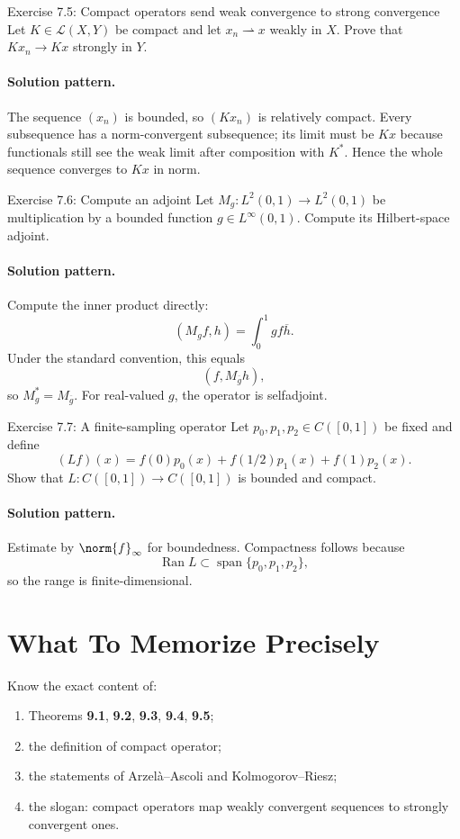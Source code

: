 \documentclass[header={Lecture 7 Exam Study Notes}]{study-note}
\begin{document}
\begin{exbox}{Exercise 7.5: Compact operators send weak convergence to strong convergence}
Let $K\in\mathcal L(X,Y)$ be compact and let $x_n\rightharpoonup x$ weakly in $X$. Prove that $Kx_n\to Kx$ strongly in $Y$.

\paragraph{Solution pattern.}
The sequence $(x_n)$ is bounded, so $(Kx_n)$ is relatively compact. Every subsequence has a norm-convergent subsequence; its limit must be $Kx$ because functionals still see the weak limit after composition with $K^*$. Hence the whole sequence converges to $Kx$ in norm.
\end{exbox}

\begin{exbox}{Exercise 7.6: Compute an adjoint}
Let $M_g:L^2(0,1)\to L^2(0,1)$ be multiplication by a bounded function $g\in L^{\infty}(0,1)$. Compute its Hilbert-space adjoint.

\paragraph{Solution pattern.}
Compute the inner product directly:
\[
(M_g f,h)=\int_0^1 g f\overline{h}.
\]
Under the standard convention, this equals
\[
(f,M_{\overline g}h),
\]
so $M_g^*=M_{\overline g}$. For real-valued $g$, the operator is selfadjoint.
\end{exbox}

\begin{exbox}{Exercise 7.7: A finite-sampling operator}
Let $p_0,p_1,p_2\in C([0,1])$ be fixed and define
\[
(Lf)(x)=f(0)p_0(x)+f(1/2)p_1(x)+f(1)p_2(x).
\]
Show that $L:C([0,1])\to C([0,1])$ is bounded and compact.

\paragraph{Solution pattern.}
Estimate by $\norm{f}_{\infty}$ for boundedness. Compactness follows because
\[
\operatorname{Ran}L\subset \operatorname{span}\{p_0,p_1,p_2\},
\]
so the range is finite-dimensional.
\end{exbox}

\section{What To Memorize Precisely}

\begin{focusbox}
Know the exact content of:
\begin{enumerate}
\item Theorems \textbf{9.1}, \textbf{9.2}, \textbf{9.3}, \textbf{9.4}, \textbf{9.5};
\item the definition of compact operator;
\item the statements of Arzel\`a--Ascoli and Kolmogorov--Riesz;
\item the slogan: compact operators map weakly convergent sequences to strongly convergent ones.
\end{enumerate}
\end{focusbox}
\end{document}
